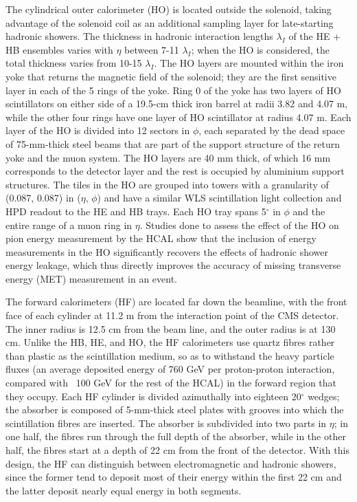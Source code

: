 The cylindrical outer calorimeter (HO) is located outside the solenoid, taking advantage of the solenoid coil as an additional sampling layer for late-starting hadronic showers. The thickness in hadronic interaction lengths $\lambda_I$ of the HE + HB ensembles varies with $\eta$ between 7-11 $\lambda_I$; when the HO is considered, the total thickness varies from 10-15 $\lambda_I$. The HO layers are mounted within the iron yoke that returns the magnetic field of the solenoid; they are the first sensitive layer in each of the 5 rings of the yoke. Ring 0 of the yoke has two layers of HO scintillators on either side of a 19.5-cm thick iron barrel at radii 3.82 and 4.07 m, while the other four rings have one layer of HO scintillator at radius 4.07 m. Each layer of the HO is divided into 12 sectors in $\phi$, each separated by the dead space of 75-mm-thick steel beams that are part of the support structure of the return yoke and the muon system. The HO layers are 40 mm thick, of which 16 mm corresponds to the detector layer and the rest is occupied by aluminium support structures. The tiles in the HO are grouped into towers with a granularity of (0.087, 0.087) in ($\eta$, $\phi$) and have a similar WLS scintillation light collection and HPD readout to the HE and HB trays. Each HO tray spans 5$^{\circ}$ in $\phi$ and the entire range of a muon ring in $\eta$. Studies done to assess the effect of the HO on pion energy measurement by the HCAL show that the inclusion of energy measurements in the HO significantly recovers the effects of hadronic shower energy leakage, which thus directly improves the accuracy of missing transverse energy (MET) measurement in an event.

The forward calorimeters (HF)  are located far down the beamline, with the front face of each cylinder at 11.2 m from the interaction point of the CMS detector. The inner radius is 12.5 cm from the beam line, and the outer radius is at 130 cm. Unlike the HB, HE, and HO, the HF calorimeters use quartz fibres rather than plastic as the scintillation medium, so as to withstand the heavy particle fluxes (an average deposited energy of 760 GeV per proton-proton interaction, compared with ~100 GeV for the rest of the HCAL) in the forward region that they occupy. Each HF cylinder is divided azimuthally into eighteen 20$^{\circ}$ wedges; the absorber is composed of 5-mm-thick steel plates with grooves into which the scintillation fibres are inserted. The absorber is subdivided into two parts in $\eta$; in one half, the fibres run through the full depth of the absorber, while in the other half, the fibres start at a depth of 22 cm from the front of the detector. With this design, the HF can distinguish between electromagnetic and hadronic showers, since the former tend to deposit most of their energy within the first 22 cm and the latter deposit nearly equal energy in both segments. 

